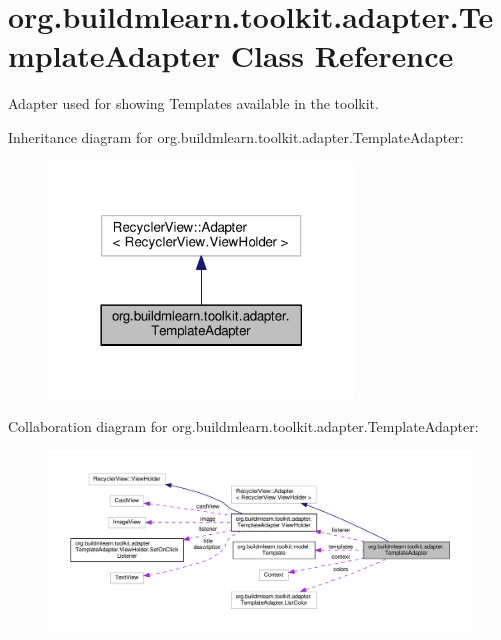 \hypertarget{classorg_1_1buildmlearn_1_1toolkit_1_1adapter_1_1TemplateAdapter}{}\section{org.\+buildmlearn.\+toolkit.\+adapter.\+Template\+Adapter Class Reference}
\label{classorg_1_1buildmlearn_1_1toolkit_1_1adapter_1_1TemplateAdapter}


Adapter used for showing Templates available in the toolkit.  




Inheritance diagram for org.\+buildmlearn.\+toolkit.\+adapter.\+Template\+Adapter\+:
\nopagebreak
\begin{figure}[H]
\begin{center}
\leavevmode
\includegraphics[width=230pt]{classorg_1_1buildmlearn_1_1toolkit_1_1adapter_1_1TemplateAdapter__inherit__graph}
\end{center}
\end{figure}


Collaboration diagram for org.\+buildmlearn.\+toolkit.\+adapter.\+Template\+Adapter\+:
\nopagebreak
\begin{figure}[H]
\begin{center}
\leavevmode
\includegraphics[width=350pt]{classorg_1_1buildmlearn_1_1toolkit_1_1adapter_1_1TemplateAdapter__coll__graph}
\end{center}
\end{figure}
